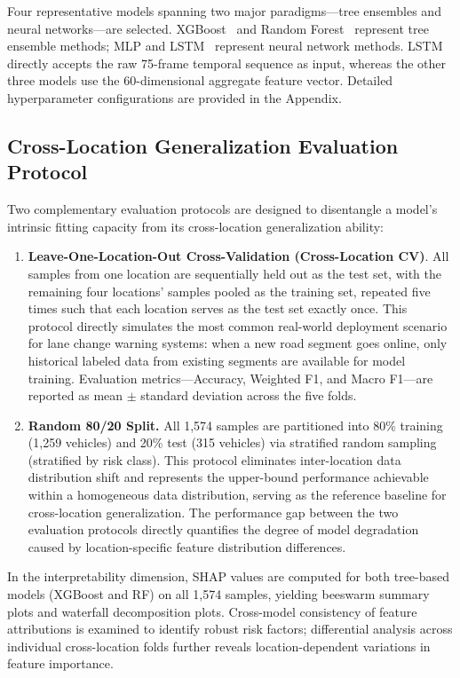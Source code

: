 \documentclass[preprint,review,12pt,a4paper]{elsarticle}
\begin{document}
Four representative models spanning two major paradigms---tree ensembles and neural networks---are selected. XGBoost~\cite{C19} and Random Forest~\cite{C20} represent tree ensemble methods; MLP and LSTM~\cite{C25} represent neural network methods. LSTM directly accepts the raw 75-frame temporal sequence as input, whereas the other three models use the 60-dimensional aggregate feature vector. Detailed hyperparameter configurations are provided in the Appendix.

\subsection{Cross-Location Generalization Evaluation Protocol}

Two complementary evaluation protocols are designed to disentangle a model's intrinsic fitting capacity from its cross-location generalization ability:

\begin{enumerate}
  \item \textbf{Leave-One-Location-Out Cross-Validation (Cross-Location CV)}. All samples from one location are sequentially held out as the test set, with the remaining four locations' samples pooled as the training set, repeated five times such that each location serves as the test set exactly once. This protocol directly simulates the most common real-world deployment scenario for lane change warning systems: when a new road segment goes online, only historical labeled data from existing segments are available for model training. Evaluation metrics---Accuracy, Weighted F1, and Macro F1---are reported as mean $\pm$ standard deviation across the five folds.

  \item \textbf{Random 80/20 Split.} All 1,574 samples are partitioned into 80\% training (1,259 vehicles) and 20\% test (315 vehicles) via stratified random sampling (stratified by risk class). This protocol eliminates inter-location data distribution shift and represents the upper-bound performance achievable within a homogeneous data distribution, serving as the reference baseline for cross-location generalization. The performance gap between the two evaluation protocols directly quantifies the degree of model degradation caused by location-specific feature distribution differences.
\end{enumerate}

In the interpretability dimension, SHAP values are computed for both tree-based models (XGBoost and RF) on all 1,574 samples, yielding beeswarm summary plots and waterfall decomposition plots. Cross-model consistency of feature attributions is examined to identify robust risk factors; differential analysis across individual cross-location folds further reveals location-dependent variations in feature importance.
\end{document}
